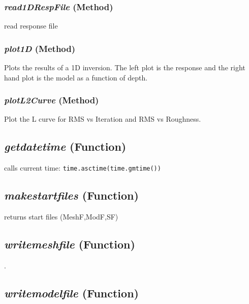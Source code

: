 \subsubsection{\textit{read1DRespFile} (Method)}
\label{sssec:.modeling.occamtools.Occam1D.read1DRespFile}

read response file

\subsubsection{\textit{plot1D} (Method)}
\label{sssec:.modeling.occamtools.Occam1D.plot1D}

Plots the results of a 1D inversion.  The left plot is the response
        and the right hand plot is the model as a function of depth.

\subsubsection{\textit{plotL2Curve} (Method)}
\label{sssec:.modeling.occamtools.Occam1D.plotL2Curve}

Plot the L curve for RMS vs Iteration and RMS vs Roughness.

\subsection{\textit{getdatetime} (Function)}
\label{ssec:.modeling.occamtools.getdatetime}

calls current time:  \texttt{time.asctime(time.gmtime())}

\subsection{\textit{makestartfiles} (Function)}
\label{ssec:.modeling.occamtools.makestartfiles}

returns start files (MeshF,ModF,SF)


\subsection{\textit{writemeshfile} (Function)}
\label{ssec:.modeling.occamtools.writemeshfile}

.

\subsection{\textit{writemodelfile} (Function)}
\label{ssec:.modeling.occamtools.writemodelfile}

